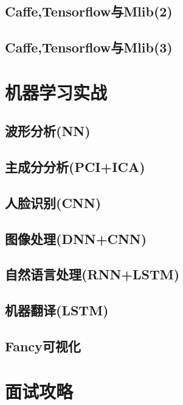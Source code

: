 \documentclass[UTF8]{article}
\begin{document}
        \subsection{Caffe,Tensorflow与Mlib(2)}

        \subsection{Caffe,Tensorflow与Mlib(3)}

    \section{机器学习实战}
        \subsection{波形分析(NN)}

        \subsection{主成分分析(PCI+ICA)}

        \subsection{人脸识别(CNN)}

        \subsection{图像处理(DNN+CNN)}

        \subsection{自然语言处理(RNN+LSTM)}

        \subsection{机器翻译(LSTM)}

        \subsection{Fancy可视化}
      
    \section{面试攻略}

\end{document}
